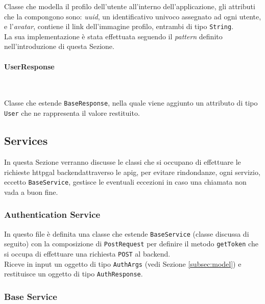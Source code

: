 \noindent Classe che modella il profilo dell'utente all'interno dell'applicazione, gli attributi che la compongono sono: \emph{uuid}, un identificativo univoco assegnato ad ogni utente, e l'\emph{avatar}, contiene il link dell'immagine profilo, entrambi di tipo \lstinline{String}. \\
La sua implementazione è stata effettuata seguendo il \emph{pattern} definito nell'introduzione di questa Sezione.

\paragraph*{UserResponse} ~ \\
\label{par:user-response}

\noindent Classe che estende \lstinline{BaseResponse}, nella quale viene aggiunto un attributo di tipo \lstinline{User} che ne rappresenta il valore restituito.

\subsection{Services}
\label{subsec:services}

In questa Sezione verranno discusse le classi che si occupano di effettuare le richieste \gls{httpg}\glsoccur al \gls{backend}\glsoccur attraverso le \gls{apig}\glsoccur, per evitare rindondanze, ogni servizio, eccetto \lstinline{BaseService}, gestisce le eventuali eccezioni in caso una chiamata non vada a buon fine.

\subsubsection*{Authentication Service}
\label{subsubsec:authentication-service}

In questo file è definita una classe che estende \lstinline{BaseService} (classe discussa di seguito) con la composizione di \lstinline{PostRequest} per definire il metodo \lstinline{getToken} che si occupa di effettuare una richiesta \lstinline{POST} al \gls{backend}\glsoccur. \\
Riceve in input un oggetto di tipo \lstinline{AuthArgs} (vedi Sezione \ref{subsec:model}) e restituisce un oggetto di tipo \lstinline{AuthResponse}.

\subsubsection*{Base Service}
\label{subsubsec:base-service}

